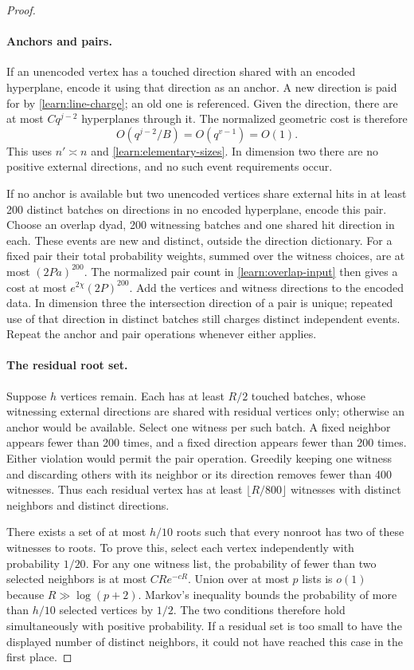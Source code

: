 \begin{proof}
\paragraph{Anchors and pairs.}
If an unencoded vertex has a touched direction shared with an encoded
hyperplane, encode it using that direction as an anchor. A new direction
is paid for by \eqref{learn:line-charge}; an old one is referenced.
Given the direction, there are at most $Cq^{j-2}$ hyperplanes through
it. The normalized geometric cost is therefore
\[
 O(q^{j-2}/B)=O(q^{v-1})=O(1).
\]
This uses $n'\asymp n$ and \eqref{learn:elementary-sizes}.
In dimension two there are no positive external directions, and no
such event requirements occur.

If no anchor is available but two unencoded vertices share external
hits in at least 200 distinct batches on directions in no encoded
hyperplane, encode this pair. Choose an overlap dyad, 200 witnessing
batches and one shared hit direction in each. These events are new and
distinct, outside the direction dictionary. For a fixed pair their
total probability weights, summed over the witness choices, are at
most $(2Pa)^{200}$. The normalized pair count in
\eqref{learn:overlap-input} then gives a cost at most
$e^{2\chi}(2P)^{200}$. Add the vertices and witness directions to the
encoded data. In dimension three the intersection direction of a
pair is unique; repeated use of that direction in distinct batches
still charges distinct independent events. Repeat the anchor and pair
operations whenever either applies.

\paragraph{The residual root set.}
Suppose $h$ vertices remain. Each has at least $R/2$ touched batches,
whose witnessing external directions are shared with residual vertices
only; otherwise an anchor would be available. Select one witness per
such batch. A fixed neighbor appears fewer than 200 times, and a fixed
direction appears fewer than 200 times. Either violation would permit
the pair operation. Greedily keeping one witness and discarding others
with its neighbor or its direction removes fewer than 400 witnesses.
Thus each residual vertex has at least $\lfloor R/800\rfloor$ witnesses
with distinct neighbors and distinct directions.

There exists a set of at most $h/10$ roots such that every nonroot has
two of these witnesses to roots. To prove this, select each vertex
independently with probability $1/20$. For any one witness list, the
probability of fewer than two selected neighbors is at most
$CR e^{-cR}$. Union over at most $p$ lists is $o(1)$ because
$R\gg\log(p+2)$. Markov's inequality bounds the probability of more
than $h/10$ selected vertices by $1/2$. The two conditions therefore
hold simultaneously with positive probability. If a residual set is
too small to have the displayed number of distinct neighbors, it could
not have reached this case in the first place.


\end{proof}
